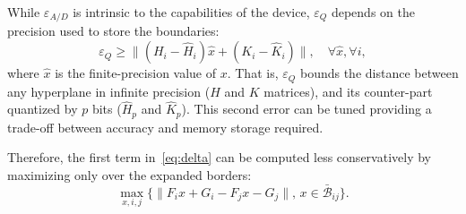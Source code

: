 While $\varepsilon_{A/D}$ is intrinsic to the capabilities of the device,
$\varepsilon_{Q}$ depends on the precision used to store the boundaries:
\begin{equation}\label{eq:quantizationlines}
  \varepsilon_{Q} \ge  \|(H_i - \hat{H}_i) \hat{x} + (K_i - \hat{K}_i)\|, \quad \forall \hat{x},\forall i,
\end{equation}
where $\hat{x}$ is the finite-precision value of $x$.
That is, $\varepsilon_{Q}$ bounds the distance between any hyperplane in infinite
precision ($H$ and $K$ matrices), and its counter-part quantized by $p$ bits 
($\hat{H}_{p}$ and $\hat{K}_{p}$).
This second error can be tuned providing a trade-off between accuracy and
memory storage required.

 Therefore, the first term in~\autoref{eq:delta} can be computed less conservatively by maximizing only over 
 the expanded borders:
 \begin{equation}
 \label{eq:maximization}
 \max_{x,i,j}\{\|F_ix+G_i-F_jx-G_j\|,\,x\in \bar{\mathcal B}_{ij}\}.
 \end{equation}
 

